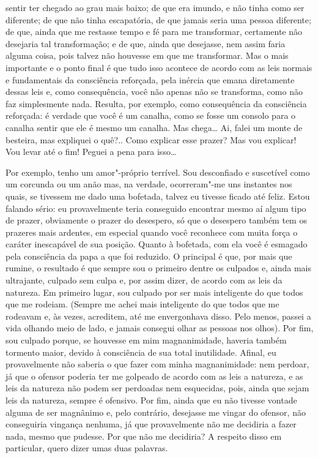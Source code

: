 sentir ter chegado ao grau mais baixo; de que era imundo, e não tinha
como ser diferente; de que não tinha escapatória, de que jamais seria
uma pessoa diferente; de que, ainda que me restasse tempo e fé para me
transformar, certamente não desejaria tal transformação; e de que, ainda
que desejasse, nem assim faria alguma coisa, pois talvez não houvesse em
que me transformar. Mas o mais importante e o ponto final é que tudo
isso acontece de acordo com as leis normais e fundamentais da
consciência reforçada, pela inércia que emana diretamente dessas leis e,
como consequência, você não apenas não se transforma, como não faz
simplesmente nada. Resulta, por exemplo, como consequência da
consciência reforçada: é verdade que você é um canalha, como se fosse um
consolo para o canalha sentir que ele é mesmo um canalha. Mas chega\ldots{}
Ai, falei um monte de besteira, mas expliquei o quê?.. Como explicar
esse prazer? Mas vou explicar! Vou levar até o fim! Peguei a pena para
isso\ldots{}

Por exemplo, tenho um amor"-próprio terrível. Sou desconfiado e
suscetível como um corcunda ou um anão mas, na verdade, ocorreram"-me uns
instantes nos quais, se tivessem me dado uma bofetada, talvez eu tivesse
ficado até feliz. Estou falando sério: eu provavelmente teria conseguido
encontrar mesmo aí algum tipo de prazer, obviamente o prazer do
desespero, só que o desespero também tem os prazeres mais ardentes, em
especial quando você reconhece com muita força o caráter inescapável de
sua posição. Quanto à bofetada, com ela você é esmagado pela consciência
da papa a que foi reduzido. O principal é que, por mais que rumine, o
resultado é que sempre sou o primeiro dentre os culpados e, ainda mais
ultrajante, culpado sem culpa e, por assim dizer, de acordo com as leis
da natureza. Em primeiro lugar, sou culpado por ser mais inteligente do
que todos que me rodeiam. (Sempre me achei mais inteligente do que todos
que me rodeavam e, às vezes, acreditem, até me envergonhava disso. Pelo
menos, passei a vida olhando meio de lado, e jamais consegui olhar as
pessoas nos olhos). Por fim, sou culpado porque, se houvesse em mim
magnanimidade, haveria também tormento maior, devido à consciência de
sua total inutilidade. Afinal, eu provavelmente não saberia o que fazer
com minha magnanimidade: nem perdoar, já que o ofensor poderia ter me
golpeado de acordo com as leis a natureza, e as leis da natureza não
podem ser perdoadas nem esquecidas, pois, ainda que sejam leis da
natureza, sempre é ofensivo. Por fim, ainda que eu não tivesse vontade
alguma de ser magnânimo e, pelo contrário, desejasse me vingar do
ofensor, não conseguiria vingança nenhuma, já que provavelmente não me
decidiria a fazer nada, mesmo que pudesse. Por que não me decidiria? A
respeito disso em particular, quero dizer umas duas palavras.


